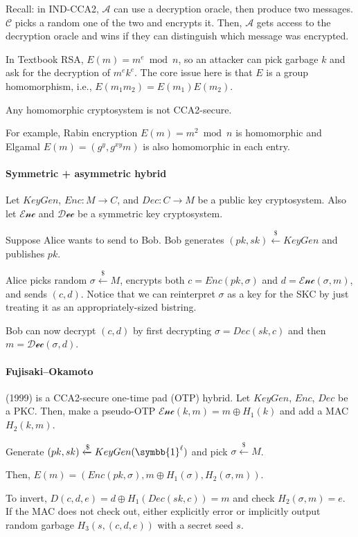 \documentclass[notes]{agony}
\newcommand{\xgets}{\xleftarrow}
\newcommand{\ndgets}{\xgets{\mathdollar}}
\newcommand{\one}{\symbb{1}}
\begin{document}
Recall: in IND-CCA2, $\mathcal A$ can use a decryption oracle,
then produce two messages.
$\mathcal C$ picks a random one of the two and encrypts it.
Then, $\mathcal A$ gets access to the decryption oracle
and wins if they can distinguish which message was encrypted.

In Textbook RSA, $E(m) = m^e \bmod n$,
so an attacker can pick garbage $k$ and ask for the decryption of $m^e k^e$.
The core issue here is that $E$ is a group homomorphism, i.e.,
$E(m_1m_2) = E(m_1)E(m_2)$.

\begin{remark}
  Any homomorphic cryptosystem is not CCA2-secure.
\end{remark}

For example, Rabin encryption $E(m) = m^2 \bmod n$ is homomorphic and
Elgamal $E(m) = (g^y, g^{xy}m)$ is also homomorphic in each entry.

\paragraph{Symmetric + asymmetric hybrid}
Let $KeyGen$, $Enc : M \to C$, and $Dec : C \to M$ be a public key cryptosystem.
Also let $\mathcal{Enc}$ and $\mathcal{Dec}$ be a symmetric key cryptosystem.

Suppose Alice wants to send to Bob.
Bob generates $(pk, sk) \ndgets KeyGen$ and publishes $pk$.

Alice picks random $\sigma \ndgets M$,
encrypts both $c = Enc(pk, \sigma)$ and $d = \mathcal{Enc}(\sigma, m)$,
and sends $(c, d)$.
Notice that we can reinterpret $\sigma$ as a key for the SKC
by just treating it as an appropriately-sized bistring.

Bob can now decrypt $(c, d)$ by first decrypting $\sigma = Dec(sk, c)$
and then $m = \mathcal{Dec}(\sigma, d)$.

\paragraph{Fujisaki--Okamoto} (1999) is a CCA2-secure one-time pad (OTP) hybrid.
Let $KeyGen$, $Enc$, $Dec$ be a PKC.
Then, make a pseudo-OTP $\mathcal{Enc}(k,m) = m \oplus H_1(k)$
and add a MAC $H_2(k,m)$.

Generate $(pk, sk) \ndgets KeyGen(\one^\ell)$
and pick $\sigma \ndgets M$.

Then, $E(m) = (Enc(pk, \sigma), m \oplus H_1(\sigma), H_2(\sigma,m))$.

To invert, $D(c, d, e) = d \oplus H_1(Dec(sk, c)) = m$
and check $H_2(\sigma, m) = e$.
If the MAC does not check out, either explicitly error
or implicitly output random garbage $H_3(s,(c,d,e))$ with a secret seed $s$.
\end{document}
